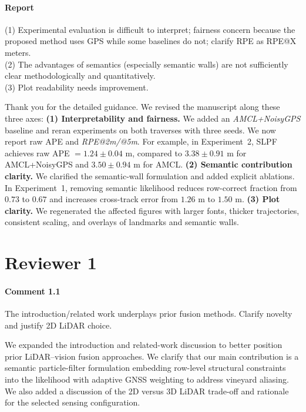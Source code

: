 \documentclass[a4paper]{article}
\def\answer#1#2{
  \begin{tcolorbox}[width=\textwidth,colback={white},title={\textbf{Answer
    #1}},colbacktitle=answerBoxColor,coltitle=white] #2
\end{tcolorbox} }
\begin{document}
\paragraph{Report}
{\color{commentColor}
  (1) Experimental evaluation is difficult to interpret; fairness concern because the proposed method uses GPS while some baselines do not; clarify RPE as RPE@X meters.\\
  (2) The advantages of semantics (especially semantic walls) are not sufficiently clear methodologically and quantitatively.\\
  (3) Plot readability needs improvement.
}

\answer{to Associate Editor}{
  Thank you for the detailed guidance. We revised the manuscript along these three axes:
  \textbf{(1) Interpretability and fairness.}
  We added an \emph{AMCL+NoisyGPS} baseline and reran experiments on both traverses with three seeds.
  We now report raw APE and \emph{RPE@2m/@5m}.
  For example, in Experiment~2, SLPF achieves raw APE $=1.24\pm0.04$ m, compared to $3.38\pm0.91$ m for AMCL+NoisyGPS and $3.50\pm0.94$ m for AMCL.
  \textbf{(2) Semantic contribution clarity.}
  We clarified the semantic-wall formulation and added explicit ablations.
  In Experiment~1, removing semantic likelihood reduces row-correct fraction from $0.73$ to $0.67$ and increases cross-track error from $1.26$ m to $1.50$ m.
  \textbf{(3) Plot clarity.}
  We regenerated the affected figures with larger fonts, thicker trajectories, consistent scaling, and overlays of landmarks and semantic walls.
}

\newpage
\section*{Reviewer 1}

\paragraph{Comment 1.1}
{\color{commentColor}
  The introduction/related work underplays prior fusion methods. Clarify novelty and justify 2D LiDAR choice.
}
\answer{1.1}{
  We expanded the introduction and related-work discussion to better position prior LiDAR–vision fusion approaches.
  We clarify that our main contribution is a semantic particle-filter formulation embedding row-level structural constraints into the likelihood with adaptive GNSS weighting to address vineyard aliasing.
  We also added a discussion of the 2D versus 3D LiDAR trade-off and rationale for the selected sensing configuration.
}
\end{document}
